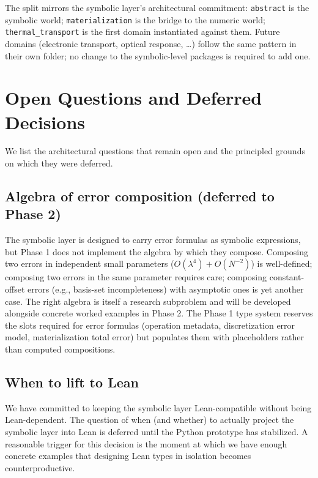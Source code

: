 \documentclass[11pt,a4paper]{article}
\begin{document}
\noindent The split mirrors the symbolic layer's architectural commitment: \texttt{abstract}
is the symbolic world; \texttt{materialization} is the bridge to the numeric world;
\texttt{thermal\_transport} is the first domain instantiated against them. Future
domains (electronic transport, optical response, …) follow the same pattern in their
own folder; no change to the symbolic-level packages is required to add one.

\section{Open Questions and Deferred Decisions}
\label{sec:open}

We list the architectural questions that remain open and the principled grounds on which they
were deferred.

\subsection{Algebra of error composition (deferred to Phase 2)}

The symbolic layer is designed to carry error formulas as symbolic expressions, but Phase 1 does not
implement the algebra by which they compose. Composing two errors in independent small parameters
($O(\lambda^4) + O(N^{-2})$) is well-defined; composing two errors in the same parameter requires
care; composing constant-offset errors (e.g., basis-set incompleteness) with asymptotic ones is
yet another case. The right algebra is itself a research subproblem and will be developed
alongside concrete worked examples in Phase 2. The Phase 1 type system reserves the slots
required for error formulas (operation metadata, discretization error model, materialization
total error) but populates them with placeholders rather than computed compositions.

\subsection{When to lift to Lean}

We have committed to keeping the symbolic layer Lean-compatible without being Lean-dependent. The
question of when (and whether) to actually project the symbolic layer into Lean is deferred until
the Python prototype has stabilized. A reasonable trigger for this decision is the moment at
which we have enough concrete examples that designing Lean types in isolation becomes
counterproductive.
\end{document}
